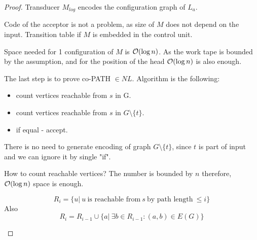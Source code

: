 \begin{proof}
	Transducer $M_{log}$ encodes the configuration graph of $L_a$.

	Code of the acceptor is not a problem, as size of $M$ does not depend on the input.
	Transition table if $M$ is embedded in the control unit.

	Space needed for 1 configuration of $M$ is $\mathcal{O}(\log n)$.
	As the work tape is bounded by the assumption, and for the position of the head $\mathcal{O}(\log n)$ is also enough.

	The last step is to prove co-PATH $\in NL$.
	Algorithm is the following:
	\begin{itemize}
		\item count vertices reachable from $s$ in G.
		\item count vertices reachable from $s$ in $G \setminus \{t\}$.
		\item if equal - accept.
	\end{itemize}

	There is no need to generate encoding of graph $G \setminus \{t\}$, since $t$ is part of input and we can ignore it by single "if".

	How to count reachable vertices? The number is bounded by $n$ therefore, $\mathcal{O}(\log n)$ space is enough.

	\begin{definition}
		\[ R_i = \{ u |\ u\ \text{is reachable from}\ s\ \text{by path length}\ \leq i \} \]
		Also
		\[ R_i = R_{i - 1} \cup \{ a |\ \exists b \in R_{i - 1}: (a, b) \in E(G) \} \]
	\end{definition}


\end{proof}
